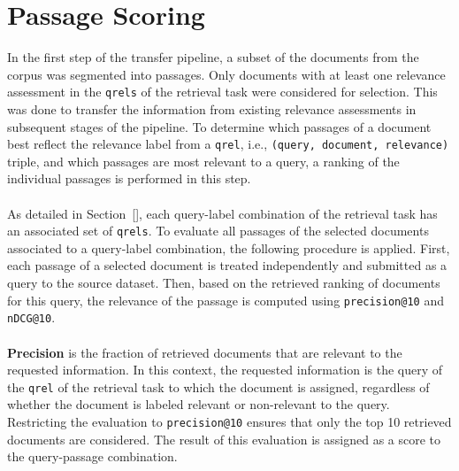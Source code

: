 \section{Passage Scoring}\label{passage-scoring}

In the first step of the transfer pipeline, a subset of the documents from the corpus was segmented into passages. Only documents with at least one relevance assessment in the \texttt{qrels} of the retrieval task were considered for selection. This was done to transfer the information from existing relevance assessments in subsequent stages of the pipeline. To determine which passages of a document best reflect the relevance label from a \texttt{qrel}, i.e., \texttt{(query, document, relevance)} triple, and which passages are most relevant to a query, a ranking of the individual passages is performed in this step.
\\\\
As detailed in Section~[], each query-label combination of the retrieval task has an associated set of \texttt{qrels}. To evaluate all passages of the selected documents associated to a query-label combination, the following procedure is applied. First, each passage of a selected document is treated independently and submitted as a query to the source dataset. Then, based on the retrieved ranking of documents for this query, the relevance of the passage is computed using \texttt{precision@10} and \texttt{nDCG@10}.
\\\\
\textbf{Precision} is the fraction of retrieved documents that are relevant to the requested information. In this context, the requested information is the query of the \texttt{qrel} of the retrieval task to which the document is assigned, regardless of whether the document is labeled relevant or non-relevant to the query. Restricting the evaluation to \texttt{precision@10} ensures that only the top 10 retrieved documents are considered. The result of this evaluation is assigned as a score to the query-passage combination.
\\\\
